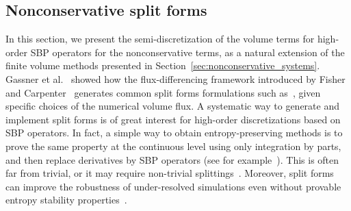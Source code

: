 \documentclass[]{scrartcl}
\theoremstyle{definition}
\begin{document}
\subsection{Nonconservative split forms}
In this section, we present the semi-discretization of the volume terms for high-order SBP operators for the nonconservative terms, as a natural extension of the finite volume methods presented in Section~\ref{sec:nonconservative_systems}.
Gassner et al.~\cite{gassner2016split} showed how the flux-differencing framework introduced by Fisher and Carpenter~\cite{FISHER2013518} generates common split forms formulations such as~\cite{KENNEDY20081676, ducros2000}, given specific choices of the numerical volume flux.
A systematic way to generate and implement split forms is of great interest for high-order discretizations based on SBP operators.
In fact, a simple way to obtain entropy-preserving methods is to prove the same property at the continuous level using only integration by parts, and then replace derivatives by SBP operators (see for example~\cite{RanochaSGN2025,ricardo2024thermodynamicconsistencystructurepreservationsummation,bleecke2025asymptoticpreservingenergyconservingmethodshyperbolic,gassner2016shallowwater}).
This is often far from trivial, or it may require non-trivial splittings~\cite{DEMICHELE2025114262}.
Moreover, split forms can improve the robustness of under-resolved simulations even without provable entropy stability properties~\cite{KENNEDY20081676,gassner2016split, Shima2021, sjogreen2017skew, klose2020assessing}.
\end{document}
